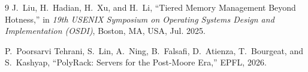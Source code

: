 \documentclass[conference]{IEEEtran}
\begin{document}
\begin{thebibliography}{9}
J.~Liu, H.~Hadian, H.~Xu, and H.~Li, ``Tiered Memory Management Beyond
Hotness,'' in \emph{19th USENIX Symposium on Operating Systems Design and
Implementation (OSDI)}, Boston, MA, USA, Jul. 2025.

P.~Poorsarvi Tehrani, S.~Lin, A.~Ning, B.~Falsafi, D.~Atienza, T.~Bourgeat,
and S.~Kashyap, ``PolyRack: Servers for the Post-Moore Era,'' EPFL, 2026.
\end{thebibliography}
\end{document}
